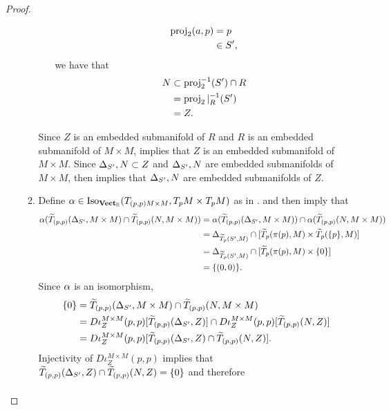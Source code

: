 \documentclass{book}
\begin{document}
\begin{proof}
\begin{enumerate}
\begin{enumerate}
\begin{itemize}
					\begin{align*}
						\operatorname{\text{proj}}_2(a, p) 
						& = p \\
						& \in S',
					\end{align*}
					we have that 
					\begin{align*}
						N 
						& \subset \operatorname{\text{proj}}_2^{-1}(S') \cap R \\
						& = \operatorname{\text{proj}}_2|_R^{-1}(S') \\
						& = Z.
					\end{align*}
				\end{itemize}
				Since $Z$ is an embedded submanifold of $R$ and $R$ is an embedded submanifold of $M \times M$,  implies that $Z$ is an embedded submanifold of $M \times M$. Since $\Delta_{S'}, N \subset Z$ and $\Delta_{S'}, N$ are embedded submanifolds of $M \times M$,  then implies that $\Delta_{S'}, N$ are embedded submanifolds of $Z$. 
				\item Define $\alpha \in \operatorname{Iso}_{\operatorname*{\text{\textbf{Vect}}_{\mathbb{R}}}}(T_{(p,p) M \times M}, T_pM \times T_p M)$ as in .  and  then imply that
				\begin{align*}
					\alpha(\widetilde{T}_{(p,p)} (\Delta_{S'}, M \times M) \cap \widetilde{T}_{(p,p)} (N, M \times M)) 
					& = \alpha(\widetilde{T}_{(p,p)} (\Delta_{S'}, M \times M)) \cap \alpha(\widetilde{T}_{(p,p)} (N, M \times M)) \\
					& = \Delta_{\widetilde{T}_p (S', M)} \cap [\widetilde{T}_p (\pi(p), M) \times \widetilde{T}_p (\{p\}, M)] \\
					& = \Delta_{\widetilde{T}_p (S', M)} \cap [\widetilde{T}_p (\pi(p), M) \times \{0\}] \\
					& = \{(0,0)\}.
				\end{align*}
				Since $\alpha$ is an isomorphism, 
				\begin{align*}
					\{0\}
					& = \widetilde{T}_{(p,p)} (\Delta_{S'}, M \times M) \cap \widetilde{T}_{(p,p)} (N, M \times M) \\
					& = D \iota_Z^{M \times M} (p,p) [\widetilde{T}_{(p,p)} (\Delta_{S'}, Z)] \cap D \iota_Z^{M \times M} (p,p) [\widetilde{T}_{(p,p)} (N, Z)] \\
					& = D \iota_Z^{M \times M} (p,p) [\widetilde{T}_{(p,p)} (\Delta_{S'}, Z) \cap \widetilde{T}_{(p,p)} (N, Z)]. 
				\end{align*} 
				Injectivity of $D \iota_Z^{M \times M} (p,p)$ implies that $\widetilde{T}_{(p,p)} (\Delta_{S'}, Z) \cap \widetilde{T}_{(p,p)} (N, Z) = \{0\}$ and therefore
				\begin{align*}

\end{align*}
\end{enumerate}
\end{enumerate}
\end{proof}
\end{document}
